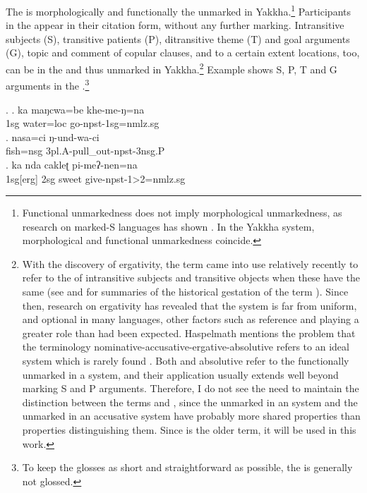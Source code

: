The  is  morphologically and functionally the unmarked  in Yakkha.\footnote{Functional unmarkedness does not imply morphological unmarkedness, as research on marked-S languages has shown \citep{Handschuh2011_thesis, Brown2001_Nias}. In the Yakkha  system, morphological and functional unmarkedness coincide.} Participants in the  appear in their citation form, without any further marking. Intransitive subjects (S), transitive patients (P), ditransitive theme  (T) and goal arguments  (G), topic and comment of copular clauses, and to a certain extent locations, too, can be in the  and thus unmarked in Yakkha.\footnote{With the discovery of ergativity, the term  came into use relatively recently to refer to the  of intransitive subjects and transitive objects when these have the same  (see \citet{McGregor2009_Ergativity} and \citet{Haspelmath2009_Terminology} for summaries of the historical gestation of the term ). Since then, research on ergativity has revealed that the system is far from uniform, and optional in many languages, other factors such as reference and  playing a greater role than had been expected. Haspelmath mentions the problem that the terminology nominative-accusative-ergative-absolutive refers to an ideal system which is rarely found \citep[513]{Haspelmath2009_Terminology}. Both  and absolutive refer to the functionally unmarked  in a system, and their application usually extends well beyond marking S and P arguments. Therefore, I do not see the need to maintain the distinction between the terms  and , since the unmarked  in an  system and the unmarked  in an accusative system have probably more shared properties than properties distinguishing them. Since  is the older term, it will be used in this work.} Example  \Next shows S, P, T and G arguments in the .\footnote{To keep the glosses as short and straightforward as possible, the  is generally not glossed.} 


\ex. \ag. ka maŋcwa=be khe-me-ŋ=na\\
			{\sc 1sg} water{\sc =loc} go{\sc -npst-1sg=nmlz.sg}\\
	\bg. nasa=ci  ŋ-und-wa-ci\\
		fish{\sc =nsg} {\sc 3pl.A-}pull\_out{\sc -npst-3nsg.P}\\
	 \bg. ka nda cakleʈ pi-meʔ-nen=na\\
		{\sc  1sg[erg]} {\sc 2sg} sweet give{\sc -npst-1>2=nmlz.sg}\\
			

